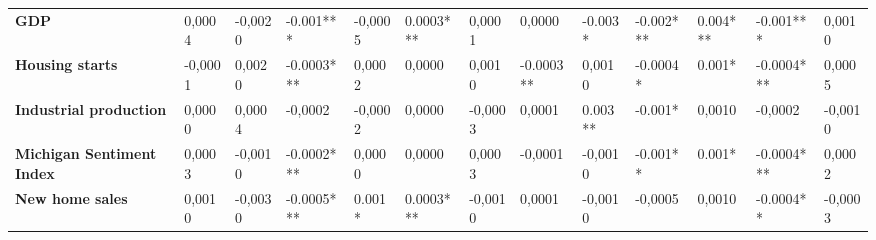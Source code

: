 \begin{landscape}
\begin{table}[]
{\begin{tabular}{@{}lllllllllllll@{}}
\textbf{GDP}                      & 0,0004                                  & -0,0020                                 & -0.001***                               & -0,0005                                 & 0.0003***                               & 0,0001                                  & 0,0000                                  & -0.003*                                 & -0.002***                               & 0.004***                                & -0.001***                               & 0,0010                                  \\
\textbf{Housing starts}           & -0,0001                                 & 0,0020                                  & -0.0003***                              & 0,0002                                  & 0,0000                                  & 0,0010                                  & -0.0003**                               & 0,0010                                  & -0.0004*                                & 0.001*                                  & -0.0004***                              & 0,0005                                  \\
\textbf{Industrial production}    & 0,0000                                  & 0,0004                                  & -0,0002                                 & -0,0002                                 & 0,0000                                  & -0,0003                                 & 0,0001                                  & 0.003**                                 & -0.001*                                 & 0,0010                                  & -0,0002                                 & -0,0010                                 \\
\textbf{Michigan Sentiment Index} & 0,0003                                  & -0,0010                                 & -0.0002***                              & 0,0000                                  & 0,0000                                  & 0,0003                                  & -0,0001                                 & -0,0010                                 & -0.001**                                & 0.001*                                  & -0.0004***                              & 0,0002                                  \\
\textbf{New home sales}           & 0,0010                                  & -0,0030                                 & -0.0005***                              & 0.001*                                  & 0.0003***                               & -0,0010                                 & 0,0001                                  & -0,0010                                 & -0,0005                                 & 0,0010                                  & -0.0004**                               & -0,0003                                 \\

\end{tabular}}
\end{table}
\end{landscape}
